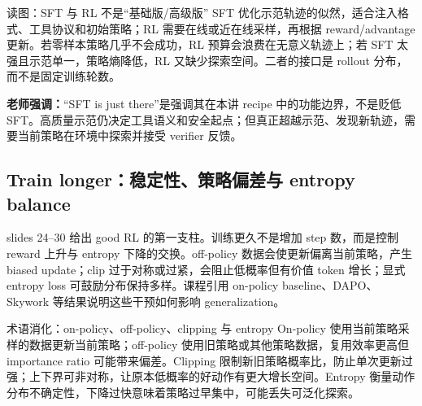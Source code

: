 \begin{knowledgebox}{读图：SFT 与 RL 不是“基础版/高级版”}
SFT 优化示范轨迹的似然，适合注入格式、工具协议和初始策略；RL 需要在线或近在线采样，再根据 reward/advantage 更新。若零样本策略几乎不会成功，RL 预算会浪费在无意义轨迹上；若 SFT 太强且示范单一，策略熵降低，RL 又缺少探索空间。二者的接口是 rollout 分布，而不是固定训练轮数。
\end{knowledgebox}

\textbf{老师强调：}“SFT is just there”是强调其在本讲 recipe 中的功能边界，不是贬低 SFT。高质量示范仍决定工具语义和安全起点；但真正超越示范、发现新轨迹，需要当前策略在环境中探索并接受 verifier 反馈。

\subsection{Train longer：稳定性、策略偏差与 entropy balance}

slides 24--30 给出 good RL 的第一支柱。训练更久不是增加 step 数，而是控制 reward 上升与 entropy 下降的交换。off-policy 数据会使更新偏离当前策略，产生 biased update；clip 过于对称或过紧，会阻止低概率但有价值 token 增长；显式 entropy loss 可鼓励分布保持多样。课程引用 on-policy baseline、DAPO、Skywork 等结果说明这些干预如何影响 generalization。


\begin{knowledgebox}{术语消化：on-policy、off-policy、clipping 与 entropy}
On-policy 使用当前策略采样的数据更新当前策略；off-policy 使用旧策略或其他策略数据，复用效率更高但 importance ratio 可能带来偏差。Clipping 限制新旧策略概率比，防止单次更新过强；上下界可非对称，让原本低概率的好动作有更大增长空间。Entropy 衡量动作分布不确定性，下降过快意味着策略过早集中，可能丢失可泛化探索。
\end{knowledgebox}

